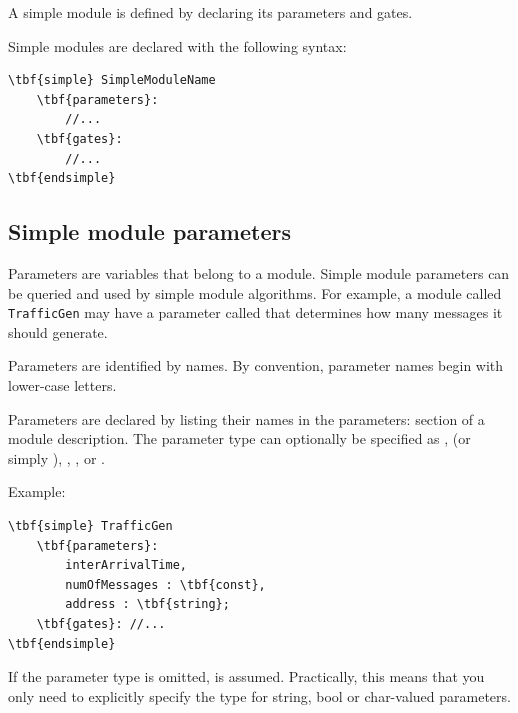 A simple module is defined by
declaring its parameters and
gates.

Simple modules are declared with the following syntax:

\begin{Verbatim}[commandchars=\\\{\}]
\tbf{simple} SimpleModuleName
    \tbf{parameters}:
        //...
    \tbf{gates}:
        //...
\tbf{endsimple}
\end{Verbatim}



\subsection{Simple module parameters}
\label{sec:ch-ned-lang:simple-module-param}


Parameters are variables that belong to a module. Simple module
parameters can be queried and used by simple module algorithms.
For example, a module called \texttt{TrafficGen} may have a parameter
called  that determines how many messages it
should generate.

Parameters are identified by names.
By convention, parameter names begin with lower-case letters.

Parameters are declared by listing their names in the
parameters: section of a
module description. The parameter type can optionally be specified as
, 
(or simply ),
, , or
.


Example:

\begin{Verbatim}[commandchars=\\\{\}]
\tbf{simple} TrafficGen
    \tbf{parameters}:
        interArrivalTime,
        numOfMessages : \tbf{const},
        address : \tbf{string};
    \tbf{gates}: //...
\tbf{endsimple}
\end{Verbatim}

If the parameter type is omitted, 
is assumed. Practically, this means that you only need to explicitly
specify the type for string, bool or char-valued parameters.

